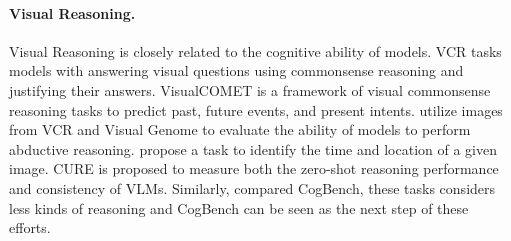 \paragraph{Visual Reasoning.}
Visual Reasoning is closely related to the cognitive ability of models.
VCR \cite{zellers2019vcr} tasks models with answering visual questions using commonsense reasoning and justifying their answers.
VisualCOMET \cite{park2020visualcomet} is a framework of visual commonsense reasoning tasks to predict past, future events, and present intents.
\citet{hessel2022abduction} utilize images from VCR and Visual Genome \cite{krishna2017visual} to evaluate the ability of models to perform abductive reasoning.
\citet{FZCVR22} propose a task to identify the time and location of a given image.
CURE \cite{chen2023measuring} is proposed to measure both the zero-shot reasoning performance and consistency of VLMs. 
Similarly, compared CogBench, these tasks considers less kinds of reasoning and CogBench can be seen as the next step of these efforts.
